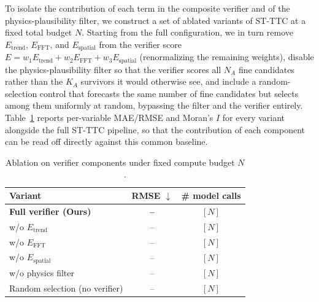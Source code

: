 \documentclass[preprint,12pt]{elsarticle}
\begin{document}
To isolate the contribution of each term in the composite verifier and of the physics-plausibility filter, we construct a set of ablated variants of ST-TTC at a fixed total budget $N$. Starting from the full configuration, we in turn remove $E_{\text{trend}}$, $E_{\text{FFT}}$, and $E_{\text{spatial}}$ from the verifier score $E = w_1 E_{\text{trend}} + w_2 E_{\text{FFT}} + w_3 E_{\text{spatial}}$ (renormalizing the remaining weights), disable the physics-plausibility filter so that the verifier scores all $N_A$ fine candidates rather than the $K_A$ survivors it would otherwise see, and include a random-selection control that forecasts the same number of fine candidates but selects among them uniformly at random, bypassing the filter and the verifier entirely. Table~\ref{tab:ablation_verifier} reports per-variable MAE/RMSE and Moran's $I$ for every variant alongside the full ST-TTC pipeline, so that the contribution of each component can be read off directly against this common baseline.

\begin{table}[H]
\centering
\small
\caption{Ablation on verifier components under fixed compute budget $N$.}
\label{tab:ablation_verifier}
\begin{tabular}{lcc}
\toprule
Variant & RMSE $\downarrow$ & \# model calls \\
\midrule
\textbf{Full verifier (Ours)} & \textbf{--} & $[N]$ \\
w/o $E_{\text{trend}}$      & --          & $[N]$ \\
w/o $E_{\text{FFT}}$        & --          & $[N]$ \\
w/o $E_{\text{spatial}}$    & --          & $[N]$ \\
w/o physics filter          & --          & $[N]$ \\
\midrule
Random selection (no verifier) & --      & $[N]$ \\
\bottomrule
\end{tabular}
\end{table}
\end{document}
